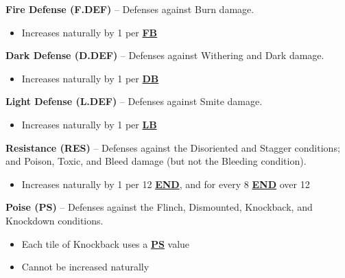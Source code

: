 \documentclass[12pt]{article}
\newcommand{\refto}[1]{\hyperlink{#1}{\textbf{#1}}}
\newcommand{\makeref}[1]{\hypertarget{#1}{\textbf{#1}}}
\begin{document}
\begin{multicols*}{2}
\textbf{Fire Defense (\makeref{F.DEF})} – Defenses against Burn damage.
\begin{itemize}
\item Increases naturally by 1 per \refto{FB}
\end{itemize}

\textbf{Dark Defense (\makeref{D.DEF})} – Defenses against Withering and Dark damage.
\begin{itemize}
\item Increases naturally by 1 per \refto{DB}
\end{itemize}

\textbf{Light Defense (\makeref{L.DEF})} – Defenses against Smite damage.
\begin{itemize}
\item Increases naturally by 1 per \refto{LB}
\end{itemize}

\textbf{Resistance (\makeref{RES})} – Defenses against the Disoriented and Stagger conditions; and Poison, Toxic, and Bleed damage (but not the Bleeding condition).
\begin{itemize}
\item Increases naturally by 1 per 12 \refto{END}, and for every 8 \refto{END} over 12
\end{itemize}

\textbf{Poise (\makeref{PS})} – Defenses against the Flinch, Dismounted, Knockback, and Knockdown conditions.
\begin{itemize}
\item Each tile of Knockback uses a \refto{PS} value
\item Cannot be increased naturally
\end{itemize}

\vspace*{\fill}
\columnbreak


\end{multicols*}
\end{document}
